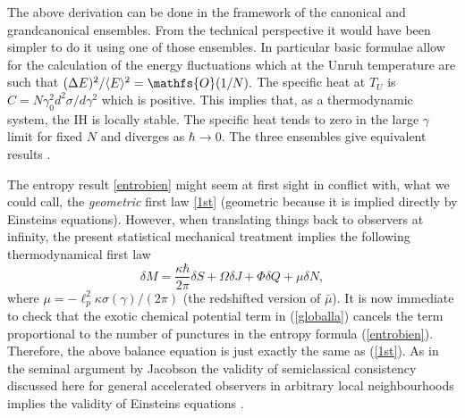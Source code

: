 \documentclass[aps, nofootinbib,superscriptaddress,12pt]{revtex4-2}
\newcommand{\va}{\scriptscriptstyle}
\def\be{\begin{equation}}
\def\ee{\end{equation}}
\newcommand{\mfs}[1]{\mathfs {#1}}                               %
\newcommand{\sO}{{\mfs O}}
\begin{document}
The above derivation can be done in the framework of the canonical and grandcanonical ensembles.
From the technical perspective it would have been simpler to do it using one of those ensembles. In particular
basic formulae allow for the calculation of the energy fluctuations 
which at the Unruh temperature are such that  
$
{(\Delta E)^2}/{\langle E\rangle^2}=\sO(1/N).
$
The specific heat at $T_{\va U}$ is
$C=N\gamma_0^2d^2\sigma/d\gamma^2$
which is  positive. This implies that, as a thermodynamic system, the IH is locally
stable. The specific heat tends to zero in the large $\gamma$ limit for fixed
$N$ and diverges as $\hbar\to 0$. The three ensembles give equivalent results \cite{Ghosh:2011fc}.

The entropy result \eqref{entrobien} might seem at first sight in conflict with, what we could call, the {\em geometric} first law \eqref{1st} (geometric because it is implied directly by Einsteins equations). 
However, when translating things back to observers at infinity, the present statistical mechanical treatment implies the following thermodynamical first law
 \be\label{globalla}
 \delta M=\frac{\kappa\hbar }{2 \pi} \delta S+\Omega \delta J+\Phi \delta Q+ \mu \delta N,
 \ee
 where $\mu=-\ell_p^2 \kappa \sigma(\gamma)/(2\pi)$ (the redshifted version of $\bar\mu$). It is now immediate to check that the exotic chemical potential term in (\ref{globalla}) cancels the term proportional to the number of punctures in the entropy formula (\ref{entrobien}). Therefore, the above balance equation is just exactly the same as (\ref{1st}). 
As in the seminal argument by Jacobson  \cite{Jacobson:1995ab}  the validity of  semiclassical consistency discussed here for general  accelerated observers in arbitrary local neighbourhoods implies the validity of Einsteins equations \cite{Smolin:2012ys}.
\end{document}

